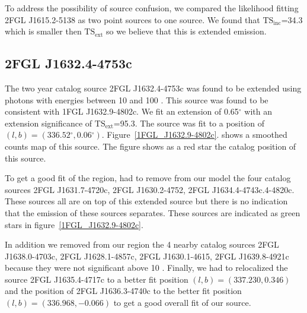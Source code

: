 \documentclass[12pt,preprint]{aastex}
\newcommand{\gev}{\text{GeV}\xspace}
\newcommand{\tsext}{{\ensuremath{\text{TS}_\text{ext}}}\xspace}
\newcommand{\tsinc}{\ensuremath{\text{TS}_\text{inc}}\xspace}
\renewcommand{\deg}{\ensuremath{^\circ}\xspace}
\begin{document}
To address the possibility of source confusion, we compared the likelihood 
fitting 2FGL J1615.2-5138 as two point sources to one source.
We found that \tsinc=34.3 which is smaller then \tsext so we believe
that this is extended emission.




\subsection{2FGL J1632.4-4753c}



The two year catalog source 2FGL J1632.4-4753c was found to be extended
using photons with energies between 10 \gev and 100 \gev.  This source
was found to be consistent with 1FGL J1632.9-4802c.  We fit an
extension of 0.65\deg with an extension significance of \tsext=95.3.
The source was fit to a position of $(l,b)=(336.52\deg,0.06\deg)$.
Figure~\ref{1FGL_J1632.9-4802c}.  shows a smoothed counts map of this
source. The figure shows as a red star the catalog position
of this source.

To get a good fit of the region, had to remove from our model the four
catalog sources 2FGL J1631.7-4720c, 2FGL J1630.2-4752,
2FGL J1634.4-4743c.4-4820c. These sources all are on top
of this extended source but there is no indication that the emission of
these sources separates.  These sources are indicated as green stars in
figure~\ref{1FGL_J1632.9-4802c}.  

In addition we removed from our region the 4 nearby catalog sources 2FGL
J1638.0-4703c, 2FGL J1628.1-4857c, 2FGL  J1630.1-4615, 2FGL J1639.8-4921c
because they were not significant above 10 \gev.  Finally, we had to
relocalized the source 2FGL J1635.4-4717c to a better fit position
$(l,b)=(337.230,0.346)$ and the position of 2FGL J1636.3-4740c to the
better fit position $(l,b)=(336.968,-0.066)$ to get a good overall fit
of our source.
\end{document}
